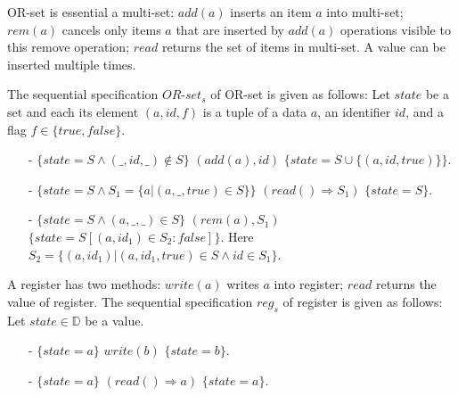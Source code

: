 \begin{example}
\label{definition:sequential specification of or-set}
OR-set is essential a multi-set: $\mathit{add}(a)$ inserts an item $a$ into multi-set; $\mathit{rem}(a)$ cancels only items $a$ that are inserted by $\mathit{add}(a)$ operations visible to this remove operation; $\mathit{read}$ returns the set of items in multi-set. A value can be inserted multiple times.

The sequential specification $\mathit{OR}$-$\mathit{set}_s$ of OR-set is given as follows: Let $\mathit{state}$ be a set and each its element $(a,\mathit{id},f)$ is a tuple of a data $a$, an identifier $\mathit{id}$, and a flag $f \in \{ \mathit{true},\mathit{false} \}$. %
\begin{itemize}
\setlength{\itemsep}{0.5pt}
\item[-] $\{ \mathit{state} = S  \wedge (\_,\mathit{id},\_) \notin S \}$ $(\mathit{add}(a),\mathit{id})$ $\{ \mathit{state} = S \cup \{ (a,\mathit{id},\mathit{true}) \} \}$.
\item[-] $\{ \mathit{state} = S \wedge S_1 = \{ a \vert (a,\_,\mathit{true}) \in S \} \}$ $(\mathit{read}() \Rightarrow S_1)$ $\{ \mathit{state} = S \}$.
\item[-] $\{ \mathit{state} = S \wedge (a,\_,\_) \in S\}$ $(rem(a),S_1)$ $\{ \mathit{state} = S[(a,\mathit{id}_1) \in S_2 : \mathit{false}] \}$. Here $S_2 = \{ (a,\mathit{id}_1) \vert (a,\mathit{id}_1,\mathit{true}) \in S \wedge id \in S_1 \}$.
\end{itemize}
\end{example}


\begin{example}
\label{definition:sequential specification of register}
A register has two methods: $\mathit{write}(a)$ writes $a$ into register; $\mathit{read}$ returns the value of register. The sequential specification $\mathit{reg}_s$ of register is given as follows: Let $\mathit{state} \in \mathbb{D}$ be a value.
\begin{itemize}
\setlength{\itemsep}{0.5pt}
\item[-] $\{ \mathit{state} = a  \}$ $\mathit{write}(b)$ $\{ \mathit{state} = b \}$.
\item[-] $\{ \mathit{state} = a \}$ $(\mathit{read}() \Rightarrow a)$ $\{ \mathit{state} = a \}$.
\end{itemize}
\end{example}




